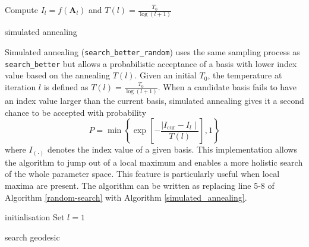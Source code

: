 \begin{algorithm}
\SetAlgoLined
    Compute $I_{l} = f(\mathbf{A}_{l})$ and $T(l) = \frac{T_0}{\log(l + 1)}$\;
  \caption{simulated annealing}
  \label{simulated_annealing}
\end{algorithm}

Simulated annealing (\texttt{search\_better\_random}) \citep[\citet{bertsimas1993simulated}]{kirkpatrick1983optimization} uses the same sampling process as \texttt{search\_better} but allows a probabilistic acceptance of a basis with lower index value based on the annealing \(T(l)\). Given an initial \(T_0\), the temperature at iteration \(l\) is defined as \(T(l) = \frac{T_0}{\log(l + 1)}\). When a candidate basis fails to have an index value larger than the current basis, simulated annealing gives it a second chance to be accepted with probability \[P= \min\left\{\exp\left[-\frac{\mid I_{\text{cur}} - I_{l} \mid}{T(l)}\right],1\right\}\] where \(I_{(\cdot)}\) denotes the index value of a given basis. This implementation allows the algorithm to jump out of a local maximum and enables a more holistic search of the whole parameter space. This feature is particularly useful when local maxima are present. The algorithm can be written as replacing line 5-8 of Algorithm \ref{random-search} with Algorithm \ref{simulated_annealing}.

\begin{algorithm}
\SetAlgoLined
{}
  initialisation\;
  Set $l = 1$\;
  \caption{search geodesic}
  \label{search-geodesic}
\end{algorithm}

